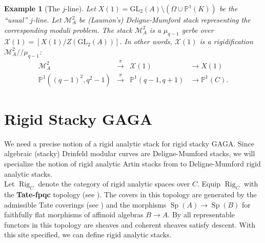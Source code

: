 \documentclass[11pt]{amsart}
\newtheorem{example}[theorem]{Example}
\newtheorem{remark}[theorem]{Remark}
\theoremstyle{definition}
\numberwithin{equation}{section}
\newcommand{\GL}{\mathrm{GL}} 	%
\newcommand{\cM}{\mathcal{M}}		%
\newcommand{\sX}{\mathscr{X}}		%
\newcommand{\bbF}{\mathbb{F}}		%
\newcommand{\bbP}{\mathbb{P}}		%
\begin{document}
		\begin{example}[The $j$-line]
			Let $X(1)=\GL_2(A)\setminus(\Omega\cup\bbP^1(K))$ be the ``usual'' $j$-line. Let $\cM^2_A$ be (Laumon's) Deligne-Mumford stack representing the corresponding moduli problem. The stack $\cM^2_A$ is a $\mu_{q-1}$ gerbe over $\sX(1)=[X(1)/Z(\GL_2(A))].$ In other words, $\sX(1)$ is a rigidification $\cM^2_A/\!/\mu_{q-1}$: 
			\[\begin{array}{cccl}
				\cM^2_A&\overset{\pi}{\to}&\sX(1)&\to X(1)\\
				\bbP^1((q-1)^2,q^2-1)&\overset{\pi}{\to}&\bbP^1(q-1,q+1)&\to\bbP^1(C).
			\end{array}\]
		\end{example}
		
		
		\section{Rigid Stacky GAGA}
		
		We need a precise notion of a rigid analytic stack for rigid stacky GAGA. Since algebraic (stacky) Drinfeld modular curves are Deligne-Mumford stacks, we will specialize the notion of rigid analytic Artin stacks from \cite[Section $5.1.7$]{Emerton-Gee-Hellman-categorical-p-adic-langlands} to Deligne-Mumford rigid analytic stacks.\\
		
		Let $\operatorname{Rig}_C$ denote the category of rigid analytic spaces over $C.$ Equip $\operatorname{Rig}_C$ with the \textbf{Tate-fpqc} topology (see \cite[$2.1$]{Conrad-Temkin-nonarhimedean-analytification-alg-spaces}). The covers in this topology are generated by the admissible Tate coverings (see \cite[Section $4.2$]{Frensel-vanderPut-Rigid-Analytic_Geom}) and the morphisms $\operatorname{Sp}(A)\to \operatorname{Sp}(B)$ for faithfully flat morphisms of affinoid algebras $B\to A.$ By \cite[Theorem $4.2.8$]{Conrad-ampleness-rigid-geom} all representable functors in this topology are sheaves and coherent sheaves satisfy descent. With this site specified, we can define rigid analytic stacks.
		
\end{document}

